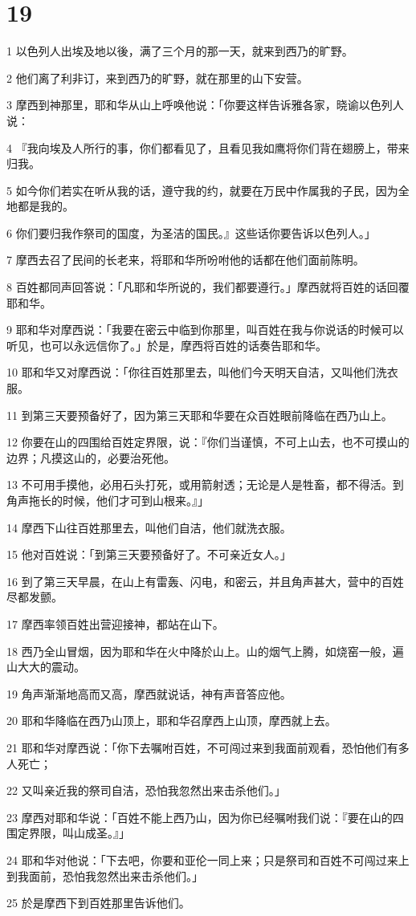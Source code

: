\chapter{19}

\par 1 以色列人出埃及地以後，满了三个月的那一天，就来到西乃的旷野。
\par 2 他们离了利非订，来到西乃的旷野，就在那里的山下安营。
\par 3 摩西到神那里，耶和华从山上呼唤他说：「你要这样告诉雅各家，晓谕以色列人说：
\par 4 『我向埃及人所行的事，你们都看见了，且看见我如鹰将你们背在翅膀上，带来归我。
\par 5 如今你们若实在听从我的话，遵守我的约，就要在万民中作属我的子民，因为全地都是我的。
\par 6 你们要归我作祭司的国度，为圣洁的国民。』这些话你要告诉以色列人。」
\par 7 摩西去召了民间的长老来，将耶和华所吩咐他的话都在他们面前陈明。
\par 8 百姓都同声回答说：「凡耶和华所说的，我们都要遵行。」摩西就将百姓的话回覆耶和华。
\par 9 耶和华对摩西说：「我要在密云中临到你那里，叫百姓在我与你说话的时候可以听见，也可以永远信你了。」於是，摩西将百姓的话奏告耶和华。
\par 10 耶和华又对摩西说：「你往百姓那里去，叫他们今天明天自洁，又叫他们洗衣服。
\par 11 到第三天要预备好了，因为第三天耶和华要在众百姓眼前降临在西乃山上。
\par 12 你要在山的四围给百姓定界限，说：『你们当谨慎，不可上山去，也不可摸山的边界；凡摸这山的，必要治死他。
\par 13 不可用手摸他，必用石头打死，或用箭射透；无论是人是牲畜，都不得活。到角声拖长的时候，他们才可到山根来。』」
\par 14 摩西下山往百姓那里去，叫他们自洁，他们就洗衣服。
\par 15 他对百姓说：「到第三天要预备好了。不可亲近女人。」
\par 16 到了第三天早晨，在山上有雷轰、闪电，和密云，并且角声甚大，营中的百姓尽都发颤。
\par 17 摩西率领百姓出营迎接神，都站在山下。
\par 18 西乃全山冒烟，因为耶和华在火中降於山上。山的烟气上腾，如烧窑一般，遍山大大的震动。
\par 19 角声渐渐地高而又高，摩西就说话，神有声音答应他。
\par 20 耶和华降临在西乃山顶上，耶和华召摩西上山顶，摩西就上去。
\par 21 耶和华对摩西说：「你下去嘱咐百姓，不可闯过来到我面前观看，恐怕他们有多人死亡；
\par 22 又叫亲近我的祭司自洁，恐怕我忽然出来击杀他们。」
\par 23 摩西对耶和华说：「百姓不能上西乃山，因为你已经嘱咐我们说：『要在山的四围定界限，叫山成圣。』」
\par 24 耶和华对他说：「下去吧，你要和亚伦一同上来；只是祭司和百姓不可闯过来上到我面前，恐怕我忽然出来击杀他们。」
\par 25 於是摩西下到百姓那里告诉他们。

